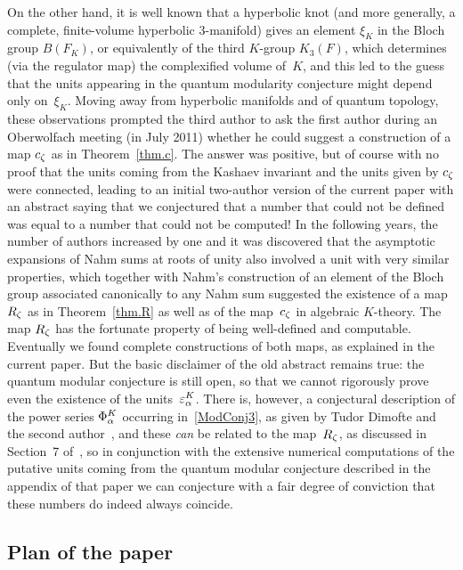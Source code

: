 \documentclass[12pt,reqno]{amsart}
\theoremstyle{definition}
\begin{document}
{On the other hand, it is well known that a hyperbolic knot (and more generally,
a complete, finite-volume hyperbolic 3-manifold) gives an element $\xi_K$
in the Bloch group $B(F_K)$, or equivalently of the third $K$-group $K_3(F)$,
which determines (via the regulator map) the complexified volume of~$K$,
and this led to the guess that the units appearing in the quantum modularity
conjecture might depend only on~$\xi_K$.  Moving away from hyperbolic manifolds
and of quantum topology, these observations prompted the third author to ask
the first author during an Oberwolfach meeting (in July 2011) whether he could
suggest a construction of a map $c_\zeta$ as in Theorem~\ref{thm.c}.
The answer was positive, but of course with no proof that the units coming from
the Kashaev invariant and the units given by $c_\zeta$ were connected, leading to
an initial two-author version of the current paper with an abstract saying that
we conjectured that a number that could not be defined was equal to a number
that could not be computed!  In the following years, the number of authors
increased by one and it was discovered that the asymptotic expansions of 
Nahm sums at roots of unity also involved a unit with very similar properties,
which together with Nahm's
construction of an element of the Bloch group associated canonically to any
Nahm sum suggested the existence of a map $R_\zeta$ as in Theorem~\ref{thm.R} as
well as of the map~$c_\zeta$ in algebraic $K$-theory.
The map $R_\zeta$ has the fortunate property of
being well-defined and computable.%
Eventually we found complete constructions of both
maps, as explained in the current paper.   But the basic disclaimer of the 
old abstract remains true: the quantum modular conjecture is still open, so
that we cannot rigorously prove even the existence of the units~$\varepsilon_\alpha^K$.
There is, however, a conjectural description of the power series $\Phi_\alpha^K$
occurring in~\eqref{ModConj3}, as given by Tudor Dimofte and the second
author~\cite{DG,DG2}, and these {\it can} be related to the map~$R_\zeta$, as
discussed in Section~7 of~\cite{GZ:quantum}, so in conjunction with the
extensive numerical computations of the putative units coming from the
quantum modular conjecture described in the appendix of that paper we can
conjecture with a fair degree of conviction that these numbers do indeed
always coincide.}

\subsection{Plan of the paper}
\label{sub.plan}
\end{document}
